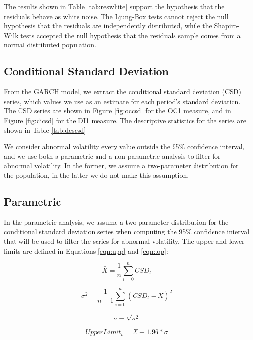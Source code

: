 \documentclass[cic,tc, english]{iiufrgs}
\begin{document}
    

    The results shown in Table \ref{tab:reswhite} support the hypothesis that the residuals behave as white noise. The Ljung-Box tests cannot reject the null hypothesis that the residuals are independently distributed, while the Shapiro-Wilk tests accepted the null hypothesis that the residuals sample comes from a normal distributed population.

\subsection{Conditional Standard Deviation}

    From the GARCH model, we extract the conditional standard deviation (CSD) series, which values we use as an estimate for each period's standard deviation. The CSD series are shown in Figure \ref{fig:occsd} for the OC1 measure, and in Figure \ref{fig:dicsd} for the DI1 measure. The descriptive statistics for the series are shown in Table \ref{tab:descsd}

    

    

    

    We consider abnormal volatility every value outside the 95\% confidence interval, and we use both a parametric and a non parametric analysis to filter for abnormal volatility. In the former, we assume a two-parameter distribution for the population, in the latter we do not make this assumption.

\subsection{Parametric}

    In the parametric analysis, we assume a two parameter distribution for the conditional standard deviation series when computing the 95\% confidence interval that will be used to filter the series for abnormal volatility. The upper and lower limits are defined in Equations \ref{eqn:upp} and \ref{eqn:lop}: 

    $$\bar{X} = \frac{1}{n} \displaystyle\sum_{i=0}^{n} CSD_t$$

    $$\sigma^2 = \frac{1}{n-1} \displaystyle\sum_{i=0}^{n} (CSD_t - \bar{X})^2$$

    $$\sigma = \sqrt{\sigma^2}$$

    \begin{equation}
        \label{eqn:upp}
        UpperLimit_t = \bar{X} + 1.96 * \sigma
    \end{equation}
\end{document}
